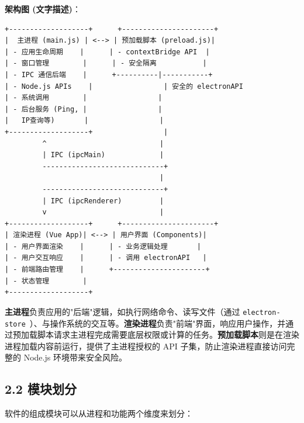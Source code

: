 \documentclass{article}
\begin{document}
\textbf{架构图 (文字描述)}：

\begin{verbatim}
+-------------------+      +----------------------+
|  主进程 (main.js) | <--> | 预加载脚本 (preload.js)|
| - 应用生命周期    |      | - contextBridge API  |
| - 窗口管理        |      | - 安全隔离           |
| - IPC 通信后端    |      +----------|-----------+
| - Node.js APIs    |                 | 安全的 electronAPI
| - 系统调用        |                 |
| - 后台服务 (Ping, |                 |
|   IP查询等)       |                 |
+-------------------+                 |
         ^                           |
         | IPC (ipcMain)             |
         -----------------------------+
                                     |
         -----------------------------+
         | IPC (ipcRenderer)         |
         v                           |
+-------------------+      +----------------------+
| 渲染进程 (Vue App)| <--> | 用户界面 (Components)|
| - 用户界面渲染    |      | - 业务逻辑处理       |
| - 用户交互响应    |      | - 调用 electronAPI   |
| - 前端路由管理    |      +----------------------+
| - 状态管理        |
+-------------------+
\end{verbatim}

\textbf{主进程}负责应用的"后端"逻辑，如执行网络命令、读写文件（通过 \texttt{electron-store}\ ）、与操作系统的交互等。\textbf{渲染进程}负责"前端"界面，响应用户操作，并通过预加载脚本请求主进程完成需要底层权限或计算的任务。\textbf{预加载脚本}则是在渲染进程加载内容前运行，提供了主进程授权的 API 子集，防止渲染进程直接访问完整的 Node.js 环境带来安全风险。

\subsection*{2.2 模块划分}

软件的组成模块可以从进程和功能两个维度来划分：
\end{document}
